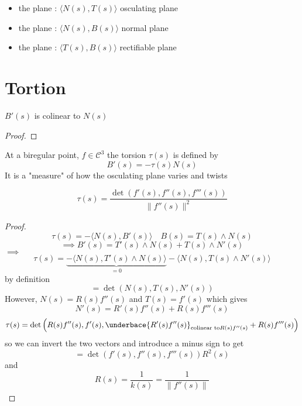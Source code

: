 \begin{defn}[]
    \begin{itemize}
        \item the plane : $ \langle N(s) , T(s)  \rangle  $ osculating plane 
        \item the plane : $ \langle N(s) , B(s)  \rangle  $ normal plane 
        \item the plane : $ \langle T(s) , B(s)  \rangle  $ rectifiable plane 
    \end{itemize} 
    \label{def:}
\end{defn}

\section{Tortion }
\label{sec:Tortion }
\begin{prop}
    $ B'(s)  $ is colinear to $ N(s) $
\end{prop}
\begin{proof}
\end{proof}

\begin{defn}[Torsion]
    At a biregular point, $ f\in \mathscr{ C } ^3 $ the torsion $ \tau (s)  $ is defined by 
    \[
        B'(s) = -\tau (s) N(s)
    \]
    It is a "measure" of how the osculating plane varies and twists 
    \label{def:Torsion}
\end{defn}

\begin{prop}
    \[
        \tau(s) = \frac{ \det \left( f'(s), f''(s), f'''(s) \right)  }{ \| f''(s) \|^{ 2}_{ }  }   
    \]
\end{prop}
\begin{proof}
    \[
        \tau(s) = - \langle N(s) , B'(s) \rangle  \quad B(s) = T(s) \wedge N(s)
    \]
    \[
        \implies B'(s) = T'(s) \wedge N(s) + T(s) \wedge N'(s) 
    \]
    $ \implies  $
    \[
        \tau(s) = \underbrace{ - \langle N(s) , T'(s) \wedge N(s) \rangle}_{=0} - \langle
        N(s) , T(s) \wedge N'(s)  \rangle 
    \] by definition 
    \[
        = \det\left( N(s), T(s), N'(s)\right) 
    \]
    However, 
    $ N(s) = R(s)f''(s)  $ and $ T(s) = f'(s) $ which gives 
    \[
        N'(s) = R'(s) f''(s) + R(s) f'''(s) 
    \]
    \[
        \tau(s) = \det \left( R(s) f''(s), f'(s) , \underbace{R'(s)f''(s)}_{\text{colinear
        to} R(s)f''(s) } + R(s)f'''(s)\right) 
    \]
    so we can invert the two vectors and introduce a minus sign to get 
    \[
        = \det\left( f'(s), f''(s), f'''(s)\right) R^2(s)
    \]
    and 
    \[
        R(s) = \frac{ 1 }{ k(s) } = \frac{ 1 }{ \| f''(s) \|^{ }_{ }  } 
    \]
\end{proof}


